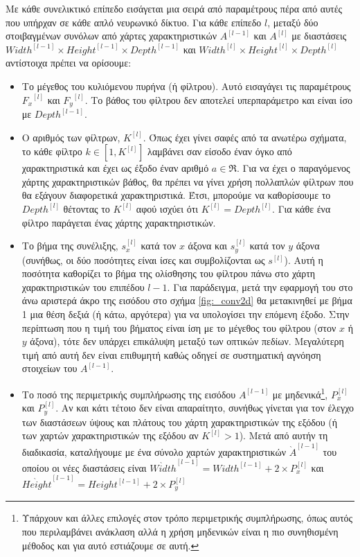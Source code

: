 Με κάθε συνελικτικό επίπεδο εισάγεται μια σειρά από παραμέτρους πέρα από αυτές που υπήρχαν σε κάθε απλό νευρωνικό δίκτυο. Για κάθε επίπεδο $l$, μεταξύ δύο στοιβαγμένων συνόλων από χάρτες χαρακτηριστικών $A^{[l-1]}$ και $A^{[l]}$ με διαστάσεις ${Width}^{[l-1]} \times {Height}^{[l-1]}\times{Depth}^{[l-1]}$ και ${Width}^{[l]} \times {Height}^{[l]}\times{Depth}^{[l]}$ αντίστοιχα πρέπει να ορίσουμε:
\begin{itemize}
  \item Το μέγεθος του κυλιόμενου πυρήνα (ή φίλτρου). Αυτό εισαγάγει τις παραμέτρους ${F_x}^{[l]}$ και ${F_y}^{[l]}$. Το βάθος του φίλτρου δεν αποτελεί υπερπαράμετρο και είναι ίσο με ${Depth}^{[l-1]}$.
  \item Ο αριθμός των φίλτρων, $K^{[l]}$. Όπως έχει γίνει σαφές από τα ανωτέρω σχήματα, το κάθε φίλτρο $k \in [1,K^{[l]}]$ λαμβάνει σαν είσοδο έναν όγκο από χαρακτηριστικά και έχει ως έξοδο έναν αριθμό $a \in \Re$. Για να έχει ο παραγόμενος χάρτης χαρακτηριστικών βάθος, θα πρέπει να γίνει χρήση πολλαπλών φίλτρων που θα εξάγουν διαφορετικά χαρακτηριστικά. Έτσι, μπορούμε να καθορίσουμε το $ {Depth}^{[l]}$ θέτοντας το $K^{[l]}$ αφού ισχύει ότι $K^{[l]} = {Depth}^{[l]}$. Για κάθε ένα φίλτρο παράγεται ένας χάρτης χαρακτηριστικών.
  \item Το βήμα της συνέλιξης, $s^{[l]}_x$ κατά τον $x$ άξονα και $s^{[l]}_y$ κατά τον $y$ άξονα (συνήθως, οι δύο ποσότητες είναι ίσες και συμβολίζονται ως $s^{[l]}$). Αυτή η ποσότητα καθορίζει το βήμα της ολίσθησης του φίλτρου πάνω στο χάρτη χαρακτηριστικών του επιπέδου $l-1$. Για παράδειγμα, μετά την εφαρμογή του στο άνω αριστερά άκρο της εισόδου στο σχήμα \ref{fig:_conv2d} θα μετακινηθεί με βήμα 1 μια θέση δεξιά (ή κάτω, αργότερα) για να υπολογίσει την επόμενη έξοδο. Στην περίπτωση που η τιμή του βήματος είναι ίση με το μέγεθος του φίλτρου (στον $x$ ή $y$ άξονα), τότε δεν υπάρχει επικάλυψη μεταξύ των οπτικών πεδίων. Μεγαλύτερη τιμή από αυτή δεν είναι επιθυμητή καθώς οδηγεί σε συστηματική αγνόηση στοιχείων του $A^{[l-1]}$.
  \item Το ποσό της περιμετρικής συμπλήρωσης της εισόδου $A^{[l-1]}$ με μηδενικά\footnote{Υπάρχουν και άλλες επιλογές στον τρόπο περιμετρικής συμπλήρωσης, όπως αυτός που περιλαμβάνει ανάκλαση αλλά η χρήση μηδενικών είναι η πιο συνηθισμένη μέθοδος και για αυτό εστιάζουμε σε αυτή.}, $P^{[l]}_x$ και $P^{[l]}_y$.  Αν και κάτι τέτοιο δεν είναι απαραίτητο, συνήθως γίνεται για τον έλεγχο των διαστάσεων ύψους και πλάτους του χάρτη χαρακτηριστικών της εξόδου (ή των χαρτών χαρακτηριστικών της εξόδου αν $K^{[l]} > 1$). Μετά από αυτήν τη διαδικασία, καταλήγουμε με ένα σύνολο χαρτών χαρακτηριστικών $\grave{A}^{[l-1]}$ του οποίου οι νέες διαστάσεις είναι $\grave{Width}^{[l-1]} = {Width}^{[l-1]} + 2\times P^{[l]}_x$ και $\grave{Height}^{[l-1]} = {Height}^{[l-1]} + 2\times P^{[l]}_y$
\end{itemize}
